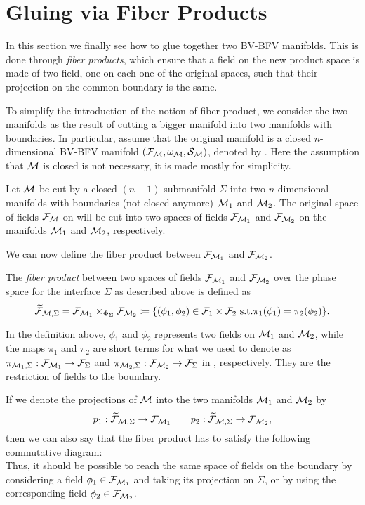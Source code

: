 \section{Gluing via Fiber Products}
\label{sec:gluing_fiber_prod}

In this section we finally see how to glue together two BV-BFV manifolds.
This is done through \emph{fiber products}, which ensure that a field on the new product space is made of two field, one on each one of the original spaces, such that their projection on the common boundary is the same.

To simplify the introduction of the notion of fiber product, we consider the two manifolds as the result of cutting a bigger manifold into two manifolds with boundaries.
In particular, assume that the original manifold is a closed $n$-dimensional BV-BFV manifold $(\mathcal{F}_{\mathcal{M}}, \omega_{\mathcal{M}}, \mathcal{S}_{\mathcal{M}})$, denoted by \M.
Here the assumption that $\mathcal{M}$ is closed is not necessary, it is made mostly for simplicity.

Let $\mathcal{M}$ be cut by a closed $(n-1)$-submanifold $\Sigma$ into two $n$-dimensional manifolds with boundaries (not closed anymore) $\mathcal{M}_1$ and $\mathcal{M}_2$.
The original space of fields $\mathcal{F}_{\mathcal{M}}$ on \M will be cut into two spaces of fields $\mathcal{F}_{\mathcal{M}_1}$ and $\mathcal{F}_{\mathcal{M}_2}$ on the manifolds $\mathcal{M}_1$ and $\mathcal{M}_2$, respectively.

We can now define the fiber product between $\mathcal{F}_{\mathcal{M}_1}$ and $\mathcal{F}_{\mathcal{M}_2}$.

\begin{definition}
    The \emph{fiber product} between two spaces of fields $\mathcal{F}_{\mathcal{M}_1}$ and $\mathcal{F}_{\mathcal{M}_2}$ over the phase space for the interface $\Sigma$ as described above is defined as
    \begin{equation}
    \label{eq:fiber_prod}
        \widetilde{\mathcal{F}}_{\mathcal{M}, \Sigma} = \mathcal{F}_{\mathcal{M}_1} \times_{\Phi_\Sigma} \mathcal{F}_{\mathcal{M}_2} 
        \coloneqq \{(\phi_1, \phi_2) \in \mathcal{F}_1 \times \mathcal{F}_2 \text{  s.t.}
        \pi_1(\phi_1) = \pi_2(\phi_2) \} .
    \end{equation}
\end{definition}

In the definition above, $\phi_1$ and $\phi_2$ represents two fields on $\mathcal{M}_1$ and $\mathcal{M}_2$, while the maps $\pi_1$ and $\pi_2$ are short terms for what we used to denote as $\pi_{\mathcal{M}_1, \Sigma}: \mathcal{F}_{\mathcal{M}_1} \rightarrow \mathcal{F}_\Sigma$ and $\pi_{\mathcal{M}_2, \Sigma}: \mathcal{F}_{\mathcal{M}_2} \rightarrow \mathcal{F}_\Sigma$ in , respectively.
They are the restriction of fields to the boundary.

If we denote the projections of $\mathcal{M}$ into the two manifolds $\mathcal{M}_1$ and $\mathcal{M}_2$ by
\begin{equation*}
    p_1: \widetilde{\mathcal{F}}_{\mathcal{M}, \Sigma} \rightarrow \mathcal{F}_{\mathcal{M}_1} 
    \qquad
    p_2: \widetilde{\mathcal{F}}_{\mathcal{M}, \Sigma} \rightarrow \mathcal{F}_{\mathcal{M}_2},
\end{equation*}
then we can also say that the fiber product has to satisfy the following commutative diagram:
\begin{equation*}
    
\end{equation*}
Thus, it should be possible to reach the same space of fields on the boundary by considering a field $\phi_1 \in \mathcal{F}_{\mathcal{M}_1}$ and taking its projection on $\Sigma$, or by using the corresponding field $\phi_2 \in \mathcal{F}_{\mathcal{M}_2}$.

